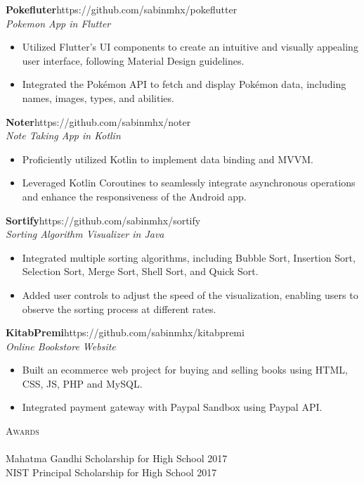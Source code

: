 \documentclass[a4paper]{article}
\newcommand{\lineunder} {
    \vspace*{-8pt} \\
    \hspace*{-18pt} \hrulefill \\
}
\newcommand{\header} [1] {
    {\hspace*{-18pt}\vspace*{6pt} \textsc{#1}}
    \vspace*{-6pt} \lineunder
}
\begin{document}
\vspace*{2mm}

{\textbf{Pokefluter}}\hfill https://github.com/sabinmhx/pokeflutter\\
\textit{Pokemon App in Flutter}
\begin{itemize} \itemsep 1pt
	\item Utilized Flutter's UI components to create an intuitive and visually appealing user interface, following Material Design guidelines.  
	\item Integrated the Pokémon API to fetch and display Pokémon data, including names, images, types, and abilities.
\end{itemize}
\vspace*{2mm}

{\textbf{Noter}}\hfill https://github.com/sabinmhx/noter\\
\textit{Note Taking App in Kotlin}
\begin{itemize} \itemsep 1pt
	\item Proficiently utilized Kotlin to implement data binding and MVVM. 
	\item Leveraged Kotlin Coroutines to seamlessly integrate asynchronous operations and enhance the responsiveness of the Android app.
\end{itemize}
\vspace*{2mm}

{\textbf{Sortify}}\hfill https://github.com/sabinmhx/sortify\\
\textit{Sorting Algorithm Visualizer in Java}
\begin{itemize} \itemsep 1pt
	\item Integrated multiple sorting algorithms, including Bubble Sort, Insertion Sort, Selection Sort, Merge Sort, Shell Sort, and Quick Sort.
	\item Added user controls to adjust the speed of the visualization, enabling users to observe the sorting process at different rates.
\end{itemize}
\vspace*{2mm}


{\textbf{KitabPremi}}\hfill https://github.com/sabinmhx/kitabpremi\\
\textit{Online Bookstore Website}
\begin{itemize} \itemsep 1pt
	\item Built an ecommerce web project for buying and selling books using HTML, CSS, JS, PHP and MySQL.  
	\item Integrated payment gateway with Paypal Sandbox using Paypal API.
\end{itemize}
\vspace*{2mm}

\header{Awards}
{Mahatma Gandhi Scholarship for High School} \hfill 2017\\
\vspace*{2mm}
{NIST Principal Scholarship for High School} \hfill 2017\\
\vspace*{2mm}

\ 
\end{document}
